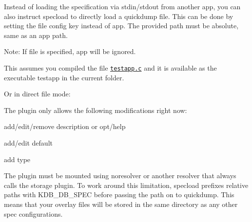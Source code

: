 Instead of loading the specification via {\ttfamily stdin}/{\ttfamily stdout} from another app, you can also instruct {\ttfamily specload} to directly load a {\ttfamily quickdump} file. This can be done by setting the {\ttfamily file} config key instead of {\ttfamily app}. The provided path must be absolute, same as an {\ttfamily app} path.

Note\+: If {\ttfamily file} is specified, {\ttfamily app} will be ignored.

This assumes you compiled the file \href{/home/mpranj/workspace/libelektra/src/plugins/specload/testapp.c}{\texttt{ {\ttfamily testapp.\+c}}} and it is available as the executable {\ttfamily testapp} in the current folder.


\begin{DoxyCode}{0}
\DoxyCodeLine{}
\DoxyCodeLine{}
\DoxyCodeLine{}
\end{DoxyCode}


Or in direct file mode\+:


\begin{DoxyCode}{0}
\DoxyCodeLine{}
\DoxyCodeLine{}
\DoxyCodeLine{}
\end{DoxyCode}



\begin{DoxyItemize}
\item The plugin only allows the following modifications right now\+:
\begin{DoxyItemize}
\item add/edit/remove {\ttfamily description} or {\ttfamily opt/help}
\item add/edit {\ttfamily default}
\item add {\ttfamily type}
\end{DoxyItemize}
\item The plugin must be mounted using {\ttfamily noresolver} or another resolver that always calls the storage plugin. To work around this limitation, {\ttfamily specload} prefixes relative paths with {\ttfamily K\+D\+B\+\_\+\+D\+B\+\_\+\+S\+P\+EC} before passing the path on to {\ttfamily quickdump}. This means that your overlay files will be stored in the same directory as any other {\ttfamily spec} configurations. 
\end{DoxyItemize}
